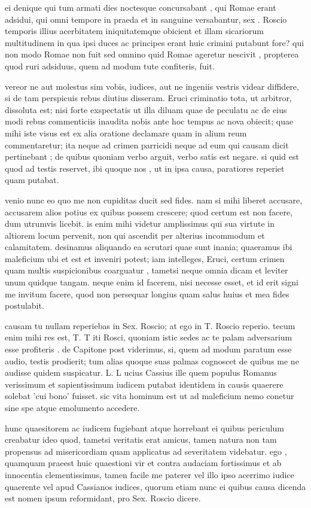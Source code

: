  ei denique qui tum armati dies noctesque concursabant , qui Romae erant adsidui, qui omni tempore in praeda et in sanguine versabantur, sex . Roscio temporis illius acerbitatem iniquitatemque obicient et illam sicariorum multitudinem in qua ipsi duces ac principes erant huic crimini putabunt fore? qui non modo Romae non fuit sed omnino quid Romae ageretur nescivit , propterea quod ruri adsiduus, quem ad modum tute confiteris, fuit.

 vereor ne aut molestus sim vobis, iudices, aut ne ingeniis vestris videar diffidere, si de tam perspicuis rebus diutius disseram. Eruci criminatio tota, ut arbitror, dissoluta est; nisi forte exspectatis ut illa diluam quae de peculatu ac de eius modi rebus commenticiis inaudita nobis ante hoc tempus ac nova obiecit; quae mihi iste visus est ex alia oratione declamare quam in alium reum commentaretur; ita neque ad crimen parricidi neque ad eum qui causam dicit pertinebant ; de quibus quoniam verbo arguit, verbo satis est negare. si quid est quod ad testis reservet, ibi quoque nos , ut in ipsa causa, paratiores reperiet quam putabat.

 venio nunc eo quo me non cupiditas ducit sed fides. nam si mihi liberet accusare, accusarem alios potius ex quibus possem crescere; quod certum est non facere, dum utrumvis licebit. is enim mihi videtur amplissimus qui sua virtute in altiorem locum pervenit, non qui ascendit per alterius incommodum et calamitatem. desinamus aliquando ea scrutari quae sunt inania; quaeramus ibi maleficium ubi et est et inveniri potest; iam intelleges, Eruci, certum crimen quam multis suspicionibus coarguatur , tametsi neque omnia dicam et leviter unum quidque tangam. neque enim id facerem, nisi necesse esset, et id erit signi me invitum facere, quod non persequar longius quam salus huius et mea fides postulabit.

 causam tu nullam reperiebas in Sex. Roscio; at ego in T. Roscio reperio. tecum enim mihi res est, T. T iti Rosci, quoniam istic sedes ac te palam adversarium esse profiteris . de Capitone post viderimus, si, quem ad modum paratum esse audio, testis prodierit; tum alias quoque suas palmas cognoscet de quibus me ne audisse quidem suspicatur. L. L ucius Cassius ille quem populus Romanus verissimum et sapientissimum iudicem putabat identidem in causis quaerere solebat 'cui bono' fuisset. sic vita hominum est ut ad maleficium nemo conetur sine spe atque emolumento accedere.

 hunc quaesitorem ac iudicem fugiebant atque horrebant ei quibus periculum creabatur ideo quod, tametsi veritatis erat amicus, tamen natura non tam propensus ad misericordiam quam applicatus ad severitatem videbatur. ego , quamquam praeest huic quaestioni vir et contra audaciam fortissimus et ab innocentia clementissimus, tamen facile me paterer vel illo ipso acerrimo iudice quaerente vel apud Cassianos iudices, quorum etiam nunc ei quibus causa dicenda est nomen ipsum reformidant, pro Sex. Roscio dicere.

